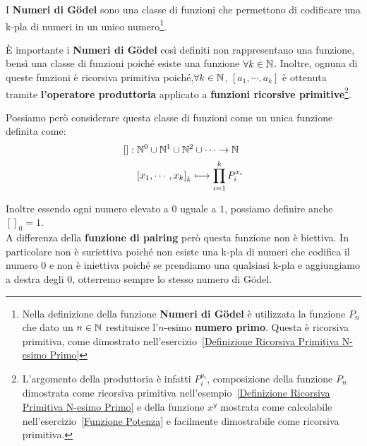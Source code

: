 I \textbf{Numeri di Gödel} sono una classe di funzioni che permettono di codificare una k-pla di numeri in un unico numero\footnote{Nella definizione della funzione \textbf{Numeri di Gödel} è utilizzata la funzione \(P_n\) che dato un \(n\in\mathbb{N}\) restituisce l'\(n\text{-esimo}\) \textbf{numero primo}. Questa è ricorsiva primitiva, come dimostrato nell'esercizio~\ref{Definizione Ricorsiva Primitiva N-esimo Primo}}.

È importante i \textbf{Numeri di Gödel} così definiti non rappresentano una funzione, bensì una classe di funzioni poiché esiste una funzione \(\forall k \in \mathbb{N}\). Inoltre, ognuna di queste funzioni è ricorsiva primitiva poiché,\( \forall k \in \mathbb{N}\), \([a_1,\cdots,a_k]\) è ottenuta tramite \textbf{l'operatore produttoria} applicato a \textbf{funzioni ricorsive primitive}\footnote{L'argomento della produttoria è infatti \(P_i^{a_i}\), composizione della funzione \(P_n\) dimostrata come ricorsiva primitiva nell'esempio~\ref{Definizione Ricorsiva Primitiva N-esimo Primo} e della funzione \(x^y\) mostrata come calcolabile nell'esercizio~\ref{Funzione Potenza} e facilmente dimostrabile come ricorsiva primitiva.}.

Possiamo però considerare questa classe di funzioni come un unica funzione definita come:
\begin{equation}
  \begin{split}
  []: \;&\mathbb{N}^0\cup\mathbb{N}^1\cup\mathbb{N}^2\cup\cdots\rightarrow\mathbb{N}\\
  &{[x_1,\cdots,x_k]}_k \longmapsto  \prod_{i=1}^k P_i^{x_i}\\
  \end{split}
\end{equation}

Inoltre essendo ogni numero elevato a \(0\) uguale a \(1\), possiamo definire anche \({[]}_0=1\).\\
A differenza della \textbf{funzione di pairing} però questa funzione non è biettiva. In particolare non è suriettiva poiché non esiste una k-pla di numeri che codifica il numero \(0\) e non è iniettiva poiché se prendiamo una qualsiasi k-pla e aggiungiamo a destra degli \(0\), otterremo sempre lo stesso numero di Gödel.

